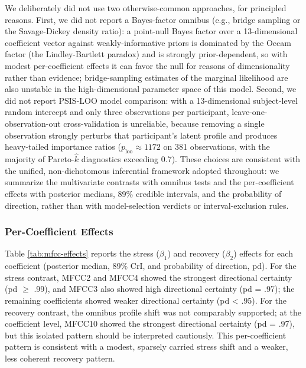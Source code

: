\documentclass[
  english,
  man,floatsintext]{apa6}
\begin{document}
We deliberately did not use two otherwise-common approaches, for principled reasons. First, we did not report a Bayes-factor omnibus (e.g., bridge sampling or the Savage-Dickey density ratio): a point-null Bayes factor over a 13-dimensional coefficient vector against weakly-informative priors is dominated by the Occam factor (the Lindley-Bartlett paradox) and is strongly prior-dependent, so with modest per-coefficient effects it can favor the null for reasons of dimensionality rather than evidence; bridge-sampling estimates of the marginal likelihood are also unstable in the high-dimensional parameter space of this model. Second, we did not report PSIS-LOO model comparison: with a 13-dimensional subject-level random intercept and only three observations per participant, leave-one-observation-out cross-validation is unreliable, because removing a single observation strongly perturbs that participant's latent profile and produces heavy-tailed importance ratios (\(p_{\text{loo}} \approx 1172\) on 381 observations, with the majority of Pareto-\(\hat{k}\) diagnostics exceeding 0.7). These choices are consistent with the unified, non-dichotomous inferential framework adopted throughout: we summarize the multivariate contrasts with omnibus tests and the per-coefficient effects with posterior medians, 89\% credible intervals, and the probability of direction, rather than with model-selection verdicts or interval-exclusion rules.

\subsubsection{Per-Coefficient Effects}\label{per-coefficient-effects}

Table \ref{tab:mfcc-effects} reports the stress (\(\beta_1\)) and recovery (\(\beta_2\)) effects for each coefficient (posterior median, 89\% CrI, and probability of direction, pd). For the stress contrast, MFCC2 and MFCC4 showed the strongest directional certainty (pd \(\geq\) .99), and MFCC3 also showed high directional certainty (pd = .97); the remaining coefficients showed weaker directional certainty (pd \textless{} .95). For the recovery contrast, the omnibus profile shift was not comparably supported; at the coefficient level, MFCC10 showed the strongest directional certainty (pd = .97), but this isolated pattern should be interpreted cautiously. This per-coefficient pattern is consistent with a modest, sparsely carried stress shift and a weaker, less coherent recovery pattern.
\end{document}
